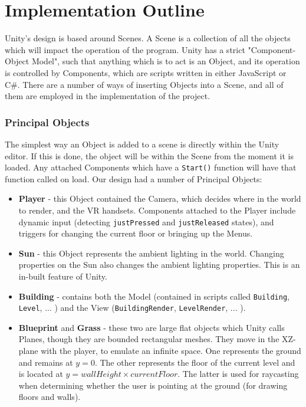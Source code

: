 \section{Implementation Outline}

Unity's design is based around Scenes. A Scene is a collection of all the objects which will impact the operation of the program. Unity has a strict "Component-Object Model", such that anything which is to act is an Object, and its operation is controlled by Components, which are scripts written in either JavaScript or C\#. There are a number of ways of inserting Objects into a Scene, and all of them are employed in the implementation of the project.

\subsubsection*{Principal Objects}
\label{sec:principal}
The simplest way an Object is added to a scene is directly within the Unity editor. If this is done, the object will be within the Scene from the moment it is loaded. Any attached Components which have a \verb|Start()| function will have that function called on load. Our design had a number of Principal Objects:

\begin{itemize}
    \item \textbf{Player} - this Object contained the Camera, which decides where in the world to render, and the VR handsets. Components attached to the Player include dynamic input (detecting \verb|justPressed| and \verb|justReleased| states), and triggers for changing the current floor or bringing up the Menus.
    \item \textbf{Sun} - this Object represents the ambient lighting in the world. Changing properties on the Sun also changes the ambient lighting properties. This is an in-built feature of Unity.
    \item \textbf{Building} - contains both the Model (contained in scripts called \verb|Building|, \verb|Level|, ... ) and the View (\verb|BuildingRender|, \verb|LevelRender|, ... ). 
    \item \textbf{Blueprint} and \textbf{Grass} - these two are large flat objects which Unity calls Planes, though they are bounded rectangular meshes. They move in the XZ-plane with the player, to emulate an infinite space. One represents the ground and remains at $y=0$. The other represents the floor of the current level and is located at $y=wallHeight \times currentFloor$. The latter is used for raycasting when determining whether the user is pointing at the ground (for drawing floors and walls).
\end{itemize}


